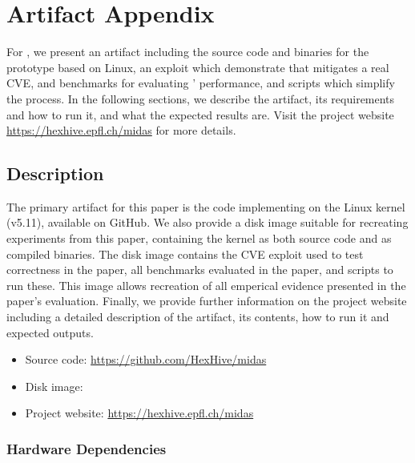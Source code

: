\section{Artifact Appendix}

For \midas{}, we present an artifact including the source code and 
binaries for the prototype based on Linux, an exploit which demonstrate 
that \midas{} mitigates a real CVE, and benchmarks for evaluating 
\midas{}' performance, and scripts which simplify the process.
In the following sections, we describe the artifact, its requirements 
and how to run it, and what the expected results are.
Visit the project website \url{https://hexhive.epfl.ch/midas} for 
more details.


\subsection{Description}


The primary artifact for this paper is the code implementing \midas{} on the
Linux kernel (v5.11), available on GitHub.
We also provide a disk image suitable for recreating experiments from this
paper, containing the kernel as both source code and as compiled binaries.
The disk image contains the CVE exploit used to test correctness in the 
paper, all benchmarks evaluated in the paper, and scripts to run these.
This image allows recreation of all emperical evidence presented in the 
paper's evaluation.
Finally, we provide further information on the project website including
a detailed description of the artifact, its contents, how to run it 
and expected outputs.
\begin{itemize}[nosep]
  \item Source code: \url{https://github.com/HexHive/midas}
  \item Disk image: \zenodorecord
  \item Project website: \url{https://hexhive.epfl.ch/midas}
\end{itemize}

\subsubsection{Hardware Dependencies}

